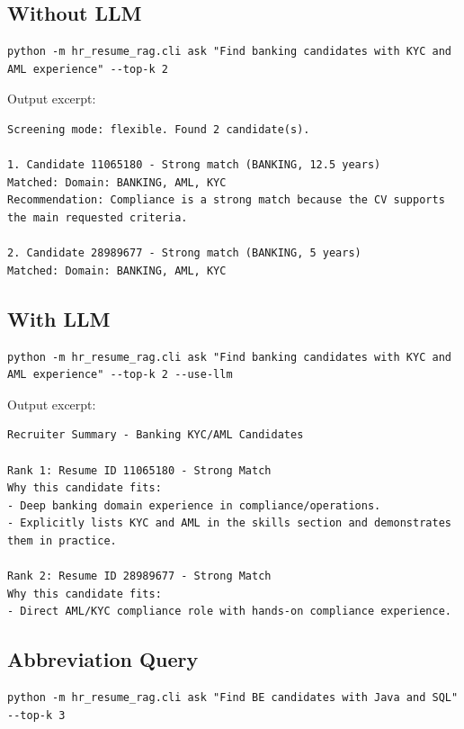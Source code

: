 \documentclass[11pt]{article}
\begin{document}
\subsection{Without LLM}

\begin{lstlisting}
python -m hr_resume_rag.cli ask "Find banking candidates with KYC and AML experience" --top-k 2
\end{lstlisting}

Output excerpt:

\begin{lstlisting}
Screening mode: flexible. Found 2 candidate(s).

1. Candidate 11065180 - Strong match (BANKING, 12.5 years)
Matched: Domain: BANKING, AML, KYC
Recommendation: Compliance is a strong match because the CV supports the main requested criteria.

2. Candidate 28989677 - Strong match (BANKING, 5 years)
Matched: Domain: BANKING, AML, KYC
\end{lstlisting}

\subsection{With LLM}

\begin{lstlisting}
python -m hr_resume_rag.cli ask "Find banking candidates with KYC and AML experience" --top-k 2 --use-llm
\end{lstlisting}

Output excerpt:

\begin{lstlisting}
Recruiter Summary - Banking KYC/AML Candidates

Rank 1: Resume ID 11065180 - Strong Match
Why this candidate fits:
- Deep banking domain experience in compliance/operations.
- Explicitly lists KYC and AML in the skills section and demonstrates them in practice.

Rank 2: Resume ID 28989677 - Strong Match
Why this candidate fits:
- Direct AML/KYC compliance role with hands-on compliance experience.
\end{lstlisting}

\subsection{Abbreviation Query}

\begin{lstlisting}
python -m hr_resume_rag.cli ask "Find BE candidates with Java and SQL" --top-k 3
\end{lstlisting}
\end{document}

